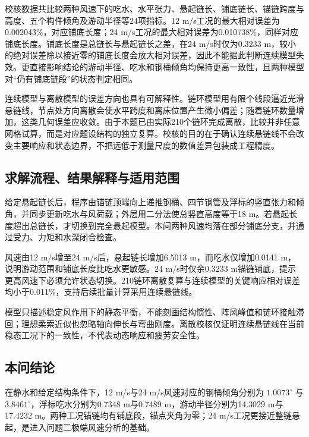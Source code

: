 校核数据共比较两种风速下的吃水、水平张力、悬起链长、铺底链长、锚链跨度与高度、五个构件倾角及游动半径等24项指标。12 m/s工况的最大相对误差为0.002043\%，对应铺底长度；24 m/s工况的最大相对误差为0.010738\%，同样对应铺底长度。铺底长度是总链长与悬起链长之差，在24 m/s时仅为0.3233 m，较小的绝对误差除以接近零的铺底长度会放大相对误差，因此不能据此判断连续模型失效。更直接影响结论的游动半径、吃水和钢桶倾角均保持更高一致性，且两种模型对“仍有铺底链段”的状态判定相同。

连续模型与离散模型的误差方向也具有可解释性。链环模型用有限个线段逼近光滑悬链线，节点处方向离散会使水平跨度和离床位置产生微小偏差；随着链环数量增加，这类几何误差应收敛。由于本题已由实际210个链环完成离散，比较并非任意网格试算，而是对应题设结构的独立复算。校核的目的在于确认连续悬链线不会改变主要响应和状态边界，不把远低于测量尺度的数值差异包装成工程精度。

\subsection{求解流程、结果解释与适用范围}
给定悬起链长后，程序由锚链顶端向上递推钢桶、四节钢管及浮标的竖直张力和倾角，并同步更新吃水与风荷载；外层用二分法使总竖直高度等于18 m。若悬起长度超出总链长，才切换到完全悬起模型。本问两种风速均落在部分铺底分支，并通过受力、力矩和水深闭合检查。

风速由12 m/s增至24 m/s后，悬起链长增加6.5013 m，而吃水仅增加0.0141 m，说明游动范围和铺底长度比吃水更敏感。24 m/s时仅余0.3233 m锚链铺底，提示更高风速下必须允许状态切换。210链环离散复算与连续模型的关键响应相对误差均小于0.011\%，支持后续批量计算采用连续悬链线。

模型只描述稳定风作用下的静态平衡，不能刻画结构惯性、阵风峰值和链环接触滞回；理想柔索近似也忽略轴向伸长与弯曲刚度。离散校核仅证明连续悬链线在当前稳态工况下的一致性，不代表动态响应和疲劳安全性。

\subsection{本问结论}
在静水和给定结构条件下，12 m/s与24 m/s风速对应的钢桶倾角分别为 \(1.0073^\circ\) 与 \(3.8461^\circ\)，浮标吃水分别为0.7348 m与0.7489 m，游动半径分别为14.3029 m与17.4232 m。两种工况锚链均有铺底段，锚点夹角为零；24 m/s工况更接近整链悬起，是进入问题二极端风速分析的基础。
